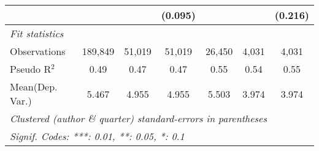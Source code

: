 \begin{tabular}{lcccccc}
                                  &                &                & (0.095)       &               &         & (0.216)\\   
   \midrule
   \emph{Fit statistics}\\
   Observations                   & 189,849        & 51,019         & 51,019        & 26,450        & 4,031   & 4,031\\  
   Pseudo R$^2$                   & 0.49           & 0.47           & 0.47          & 0.55          & 0.54    & 0.55\\  
Mean(Dep. Var.) & 5.467 & 4.955 & 4.955 & 5.503 & 3.974 & 3.974 \\
   \midrule \midrule
   \multicolumn{7}{l}{\emph{Clustered (author \& quarter) standard-errors in parentheses}}\\
   \multicolumn{7}{l}{\emph{Signif. Codes: ***: 0.01, **: 0.05, *: 0.1}}\\
\end{tabular}
\par\endgroup

